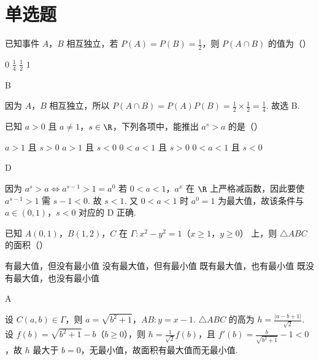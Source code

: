 \documentclass[UTF8,a4paper,oneside,11pt]{ctexbook}
\begin{document}
\section{单选题}

\begin{problem}
已知事件 \(A\)，\(B\) 相互独立，若 \(P(A)=P(B)=\frac{1}{2}\)，则 \(P(A\cap B)\) 的值为（\quad）

\choices
    {\(0\)}
    {\(\frac{1}{4}\)}
    {\(\frac{1}{2}\)}
    {\(1\)}
\end{problem}

\begin{answer}
B
\end{answer}

\begin{solution}
因为 \(A\)，\(B\) 相互独立，所以 \(P(A\cap B)=P(A)P(B)=\frac{1}{2}\times\frac{1}{2}=\frac{1}{4}\). 故选 B.
\end{solution}

\begin{problem}
已知 \(a>0\) 且 \(a\ne1\)，\(s\in\R\)，下列各项中，能推出 \(a^s>a\) 的是（\quad）

\choices
    {\(a>1\) 且 \(s>0\)}
    {\(a>1\) 且 \(s<0\)}
    {\(0<a<1\) 且 \(s>0\)}
    {\(0<a<1\) 且 \(s<0\)}
\end{problem}

\begin{answer}
D
\end{answer}

\begin{solution}
因为
\(
a^s>a\iff a^{s-1}>1=a^0
\)
若 \(0<a<1\)，\(a^x\) 在 \(\R\) 上严格减函数，因此要使 \(a^{s-1}>1\) 需 \(s-1<0\). 故 \(s<1\). 又 \(0<a<1\) 时 \(a^0=1\) 为最大值，故该条件与 \(a\in(0,1)\)，\(s<0\) 对应的 D 正确.
\end{solution}

\begin{problem}
已知 \(A(0,1)\)，\(B(1,2)\)，\(C\) 在 \(\Gamma:x^2-y^2=1\)（\(x\ge1\)，\(y\ge0\)） 上，则 \(\triangle ABC\) 的面积（\quad）

\choices
    {有最大值，但没有最小值}
    {没有最大值，但有最小值}
    {既有最大值，也有最小值}
    {既没有最大值，也没有最小值}
\end{problem}

\begin{answer}
A
\end{answer}

\begin{solution}
设 \(C(a,b)\in\Gamma\)，则 \(a=\sqrt{b^2+1}\)，\(AB: y=x-1\). \(\triangle ABC\) 的高为 \(h=\frac{|a-b+1|}{\sqrt2}\).
设 \(f(b)=\sqrt{b^2+1}-b\)（\(b\ge0\)），则 \(h=\frac{1}{\sqrt2}f(b)\)，且 \(f'(b)=\frac{b}{\sqrt{b^2+1}}-1<0\)，故 \(h\) 最大于 \(b=0\)，无最小值，故面积有最大值而无最小值.
\end{solution}
\end{document}
